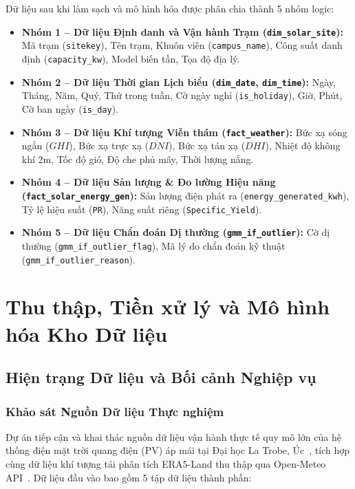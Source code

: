 \documentclass[12pt, a4paper]{report}
\begin{document}
Dữ liệu sau khi làm sạch và mô hình hóa được phân chia thành 5 nhóm logic:
\begin{itemize}[noitemsep]
    \item \textbf{Nhóm 1 -- Dữ liệu Định danh và Vận hành Trạm (\texttt{dim\_solar\_site}):} Mã trạm (\texttt{sitekey}), Tên trạm, Khuôn viên (\texttt{campus\_name}), Công suất danh định (\texttt{capacity\_kw}), Model biến tần, Tọa độ địa lý.
    \item \textbf{Nhóm 2 -- Dữ liệu Thời gian Lịch biểu (\texttt{dim\_date}, \texttt{dim\_time}):} Ngày, Tháng, Năm, Quý, Thứ trong tuần, Cờ ngày nghỉ (\texttt{is\_holiday}), Giờ, Phút, Cờ ban ngày (\texttt{is\_day}).
    \item \textbf{Nhóm 3 -- Dữ liệu Khí tượng Viễn thám (\texttt{fact\_weather}):} Bức xạ sóng ngắn ($GHI$), Bức xạ trực xạ ($DNI$), Bức xạ tán xạ ($DHI$), Nhiệt độ không khí 2m, Tốc độ gió, Độ che phủ mây, Thời lượng nắng.
    \item \textbf{Nhóm 4 -- Dữ liệu Sản lượng \& Đo lường Hiệu năng (\texttt{fact\_solar\_energy\_gen}):} Sản lượng điện phát ra (\texttt{energy\_generated\_kwh}), Tỷ lệ hiệu suất (\texttt{PR}), Năng suất riêng (\texttt{Specific\_Yield}).
    \item \textbf{Nhóm 5 -- Dữ liệu Chẩn đoán Dị thường (\texttt{gmm\_if\_outlier}):} Cờ dị thường (\texttt{gmm\_if\_outlier\_flag}), Mã lý do chẩn đoán kỹ thuật (\texttt{gmm\_if\_outlier\_reason}).
\end{itemize}

\newpage
\chapter{Thu thập, Tiền xử lý và Mô hình hóa Kho Dữ liệu}
\label{chap:etl_modeling}

\section{Hiện trạng Dữ liệu và Bối cảnh Nghiệp vụ}
\label{sec:data_landscape}

\subsection{Khảo sát Nguồn Dữ liệu Thực nghiệm}

Dự án tiếp cận và khai thác nguồn dữ liệu vận hành thực tế quy mô lớn của hệ thống điện mặt trời quang điện (PV) áp mái tại Đại học La Trobe, Úc~\cite{wimalaratne2022unisolar}, tích hợp cùng dữ liệu khí tượng tái phân tích ERA5-Land thu thập qua Open-Meteo API~\cite{openmeteo2023}. Dữ liệu đầu vào bao gồm 5 tập dữ liệu thành phần:
\end{document}

